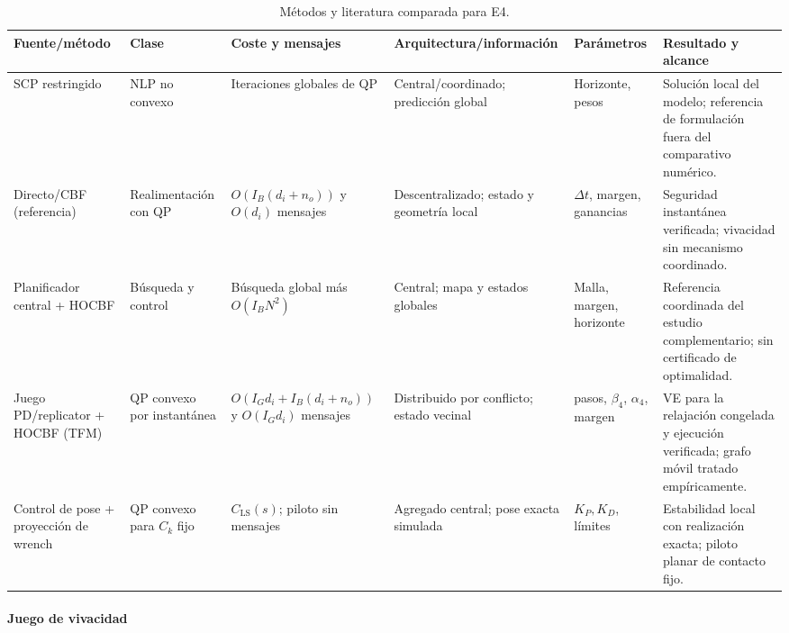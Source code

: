 \begin{table}[!htbp]
  \centering
  \caption{Métodos y literatura comparada para E4.}
  \label{tab:sp4-methods}
  \viutablefont
  \setlength{\tabcolsep}{1.05pt}
  \renewcommand{\arraystretch}{1.03}
  \begin{tabularx}{\textwidth}{>{\raggedright\arraybackslash}p{2.02cm} >{\raggedright\arraybackslash}p{1.34cm} >{\raggedright\arraybackslash}p{2.18cm} >{\raggedright\arraybackslash}p{2.05cm} >{\raggedright\arraybackslash}p{1.82cm} Y}
    \toprule
    Fuente/método & Clase & Coste y mensajes & Arquitectura/información & Parámetros & Resultado y alcance \\
    \midrule
    SCP restringido \parencite{alonsomora2017transport} & NLP no convexo & Iteraciones globales de QP & Central/coordinado; predicción global & Horizonte, pesos & Solución local del modelo; referencia de formulación fuera del comparativo numérico. \\
    Directo/CBF (referencia) & Realimentación con QP & $O(I_B(d_i+n_o))$ y $O(d_i)$ mensajes & Descentralizado; estado y geometría local & $\Delta t$, margen, ganancias & Seguridad instantánea verificada; vivacidad sin mecanismo coordinado. \\
    Planificador central + HOCBF & Búsqueda y control & Búsqueda global más $O(I_BN^2)$ & Central; mapa y estados globales & Malla, margen, horizonte & Referencia coordinada del estudio complementario; sin certificado de optimalidad. \\
    Juego PD/replicator + HOCBF (TFM) & QP convexo por instantánea & $O(I_Gd_i+I_B(d_i+n_o))$ y $O(I_Gd_i)$ mensajes & Distribuido por conflicto; estado vecinal & pasos, $\beta_4$, $\alpha_4$, margen & VE para la relajación congelada y ejecución verificada; grafo móvil tratado empíricamente. \\
    Control de pose + proyección de wrench & QP convexo para $C_k$ fijo & $C_{\mathrm{LS}}(s)$; piloto sin mensajes & Agregado central; pose exacta simulada & $K_P,K_D$, límites & Estabilidad local con realización exacta; piloto planar de contacto fijo. \\
    \bottomrule
  \end{tabularx}
\end{table}

\paragraph{Juego de vivacidad}

